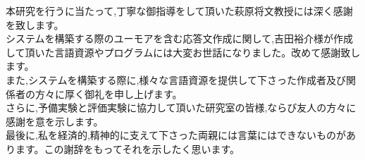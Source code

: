 本研究を行うに当たって,丁寧な御指導をして頂いた萩原将文教授には深く感謝を致します。\\
\hspace{1zw}システムを構築する際のユーモアを含む応答文作成に関して,吉田裕介様が作成して頂いた言語資源やプログラムには大変お世話になりました。改めて感謝致します。\\
\hspace{1zw}また,システムを構築する際に,様々な言語資源を提供して下さった作成者及び関係者の方々に厚く御礼を申し上げます。\\
\hspace{1zw}さらに,予備実験と評価実験に協力して頂いた研究室の皆様,ならび友人の方々に感謝を意を示します。\\
\hspace{1zw}最後に,私を経済的,精神的に支えて下さった両親には言葉にはできないものがあります。この謝辞をもってそれを示したく思います。